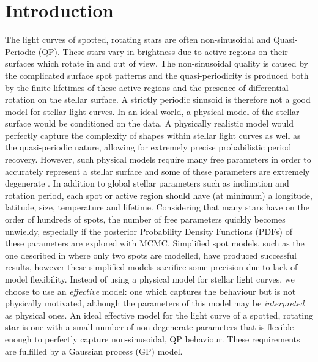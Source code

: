 \documentclass[useAMS, usenatbib, preprint, 12pt]{aastex}
\newcommand{\eg}{{\it e.g.}}
\begin{document}
\section{Introduction}

The light curves of spotted, rotating stars are often non-sinusoidal and
Quasi-Periodic (QP).
These stars vary in brightness due to active regions on their surfaces which
rotate in and out of view.
The non-sinusoidal quality is caused by the complicated surface spot patterns
and the quasi-periodicity is produced both by the finite lifetimes of these
active regions and the presence of differential rotation on the stellar
surface.
A strictly periodic sinusoid is therefore not a good model for stellar light
curves.
In an ideal world, a physical model of the stellar surface would be
conditioned on the data.
A physically realistic model would perfectly capture the complexity of shapes
within stellar light curves as well as the quasi-periodic nature, allowing for
extremely precise probabilistic period recovery.
However, such physical models require many free parameters in order to
accurately represent a stellar surface and some of these parameters are
extremely degenerate \citep[\eg][]{Russell1906, Jeffers2009}.
In addition to global stellar parameters such as inclination and rotation
period, each spot or active region should have (at minimum) a longitude,
latitude, size, temperature and lifetime.
Considering that many stars have on the order of hundreds of spots, the number
of free parameters quickly becomes unwieldy, especially if the posterior
Probability Density Functions (PDFs) of these parameters are explored with
MCMC.
Simplified spot models, such as the one described in \citet{Lanza2014} where
only two spots are modelled, have produced successful results, however these
simplified models sacrifice some precision due to lack of model flexibility.
Instead of using a physical model for stellar light curves, we choose to use
an {\it effective} model: one which captures the behaviour but is not
physically motivated, although the parameters of this model may be {\it
interpreted} as physical ones.
An ideal effective model for the light curve of a spotted, rotating star is
one with a small number of non-degenerate parameters that is flexible enough
to perfectly capture non-sinusoidal, QP behaviour.
These requirements are fulfilled by a Gaussian process (GP) model.
\end{document}
